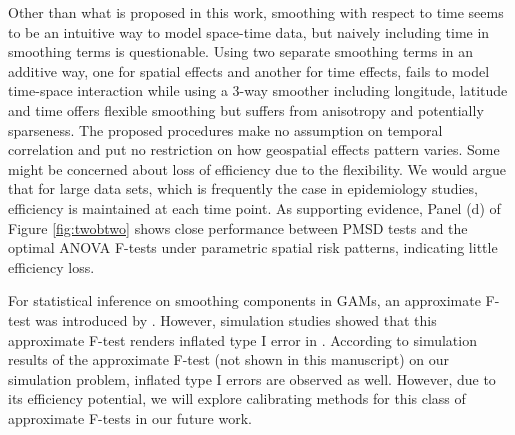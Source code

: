 	Other than what is proposed in this work, smoothing with respect to time seems to be an intuitive way to model space-time data, but naively including time in smoothing terms is questionable. Using two separate smoothing terms in an additive way, one for spatial effects and another for time effects, fails to model time-space interaction while using a 3-way smoother including longitude, latitude and time offers flexible smoothing but suffers from anisotropy and potentially sparseness. The proposed procedures make no assumption on temporal correlation and put no restriction on how geospatial effects pattern varies. Some might be concerned about loss of efficiency due to the flexibility. We would argue that for large data sets, which is frequently the case in epidemiology studies, efficiency is maintained at each time point. As supporting evidence, Panel (d) of Figure \ref{fig:twobtwo} shows close performance between PMSD tests and the optimal ANOVA F-tests under parametric spatial risk patterns, indicating little efficiency loss.
	
	For statistical inference on smoothing components in GAMs, an approximate F-test was introduced by \cite{hastie1990generalized}. However, simulation studies showed that this approximate F-test renders inflated type I error in \cite{young2011generalized}. According to simulation results of the approximate F-test (not shown in this manuscript) on our simulation problem, inflated type I errors are observed as well. However, due to its efficiency potential, we will explore calibrating methods for this class of approximate F-tests in our future work. 
	
